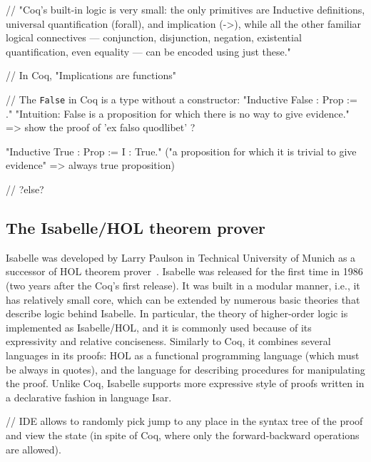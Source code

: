 \documentclass[article]{aaltoseries}
\begin{document}
// "Coq's built-in logic is very small: the only primitives are Inductive definitions, universal quantification (forall), and implication (->), while all the other familiar logical connectives — conjunction, disjunction, negation, existential quantification, even equality — can be encoded using just these."

// In Coq, "Implications are functions"

// The \texttt{False} in Coq is a type without a constructor:
	"Inductive False : Prop := ." 
"Intuition: False is a proposition for which there is no way to give evidence."
=> show the proof of 'ex falso quodlibet' ?

"Inductive True : Prop := I : True." ("a proposition for which it is trivial to give evidence" => always true proposition)



// ?else?




\subsection{The Isabelle/HOL theorem prover}
\label{sec:prover_isabelle}

Isabelle was developed by Larry Paulson in Technical University of Munich as a successor of HOL theorem prover~\cite{tool_HOL}. Isabelle was released for the first time in 1986 (two years after the Coq's first release). It was built in a modular manner, i.e., it has relatively small core, which can be extended by numerous basic theories that describe logic behind Isabelle. In particular, the theory of higher-order logic is implemented as Isabelle/HOL, and it is commonly used because of its expressivity and relative conciseness. Similarly to Coq, it combines several languages in its proofs: HOL as a functional programming language (which must be always in quotes), and the language for describing procedures for manipulating the proof. Unlike Coq, Isabelle supports more expressive style of proofs written in a declarative fashion in language Isar.

// IDE allows to randomly pick jump to any place in the syntax tree of the proof and view the state (in spite of Coq, where only the forward-backward operations are allowed).
\end{document}
